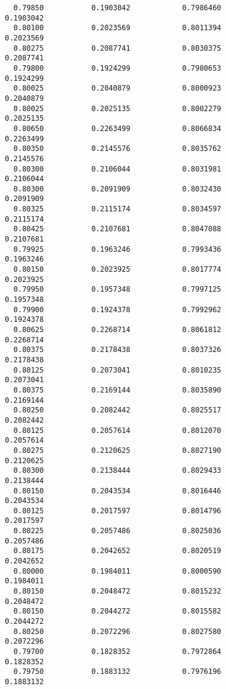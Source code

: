 \documentclass[
  letterpaper,
  DIV=11,
  numbers=noendperiod]{scrartcl}
\begin{document}
\begin{verbatim}
  0.79850           0.1903042            0.7986460            0.1903042     
  0.80100           0.2023569            0.8011394            0.2023569     
  0.80275           0.2087741            0.8030375            0.2087741     
  0.79800           0.1924299            0.7980653            0.1924299     
  0.80025           0.2040879            0.8000923            0.2040879     
  0.80025           0.2025135            0.8002279            0.2025135     
  0.80650           0.2263499            0.8066834            0.2263499     
  0.80350           0.2145576            0.8035762            0.2145576     
  0.80300           0.2106044            0.8031981            0.2106044     
  0.80300           0.2091909            0.8032430            0.2091909     
  0.80325           0.2115174            0.8034597            0.2115174     
  0.80425           0.2107681            0.8047088            0.2107681     
  0.79925           0.1963246            0.7993436            0.1963246     
  0.80150           0.2023925            0.8017774            0.2023925     
  0.79950           0.1957348            0.7997125            0.1957348     
  0.79900           0.1924378            0.7992962            0.1924378     
  0.80625           0.2268714            0.8061812            0.2268714     
  0.80375           0.2178438            0.8037326            0.2178438     
  0.80125           0.2073041            0.8010235            0.2073041     
  0.80375           0.2169144            0.8035890            0.2169144     
  0.80250           0.2082442            0.8025517            0.2082442     
  0.80125           0.2057614            0.8012070            0.2057614     
  0.80275           0.2120625            0.8027190            0.2120625     
  0.80300           0.2138444            0.8029433            0.2138444     
  0.80150           0.2043534            0.8016446            0.2043534     
  0.80125           0.2017597            0.8014796            0.2017597     
  0.80225           0.2057486            0.8025036            0.2057486     
  0.80175           0.2042652            0.8020519            0.2042652     
  0.80000           0.1984011            0.8000590            0.1984011     
  0.80150           0.2048472            0.8015232            0.2048472     
  0.80150           0.2044272            0.8015582            0.2044272     
  0.80250           0.2072296            0.8027580            0.2072296     
  0.79700           0.1828352            0.7972864            0.1828352     
  0.79750           0.1883132            0.7976196            0.1883132     

\end{verbatim}
\end{document}
